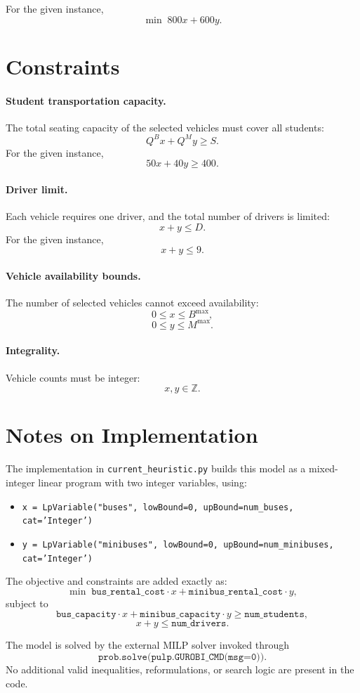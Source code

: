 For the given instance,
\[
\min \; 800x + 600y.
\]

\section*{Constraints}

\paragraph{Student transportation capacity.}
The total seating capacity of the selected vehicles must cover all students:
\[
Q^B x + Q^M y \ge S.
\]
For the given instance,
\[
50x + 40y \ge 400.
\]

\paragraph{Driver limit.}
Each vehicle requires one driver, and the total number of drivers is limited:
\[
x + y \le D.
\]
For the given instance,
\[
x + y \le 9.
\]

\paragraph{Vehicle availability bounds.}
The number of selected vehicles cannot exceed availability:
\[
0 \le x \le B^{\max},
\]
\[
0 \le y \le M^{\max}.
\]

\paragraph{Integrality.}
Vehicle counts must be integer:
\[
x, y \in \mathbb{Z}.
\]

\section*{Notes on Implementation}

The implementation in \texttt{current\_heuristic.py} builds this model as a mixed-integer linear program with two integer variables, using:
\begin{itemize}
\item \texttt{x = LpVariable("buses", lowBound=0, upBound=num\_buses, cat='Integer')}
\item \texttt{y = LpVariable("minibuses", lowBound=0, upBound=num\_minibuses, cat='Integer')}
\end{itemize}

The objective and constraints are added exactly as:
\[
\min \; \texttt{bus\_rental\_cost}\cdot x + \texttt{minibus\_rental\_cost}\cdot y,
\]
subject to
\[
\texttt{bus\_capacity}\cdot x + \texttt{minibus\_capacity}\cdot y \ge \texttt{num\_students},
\]
\[
x+y \le \texttt{num\_drivers}.
\]

The model is solved by the external MILP solver invoked through
\[
\texttt{prob.solve(pulp.GUROBI\_CMD(msg=0))}.
\]
No additional valid inequalities, reformulations, or search logic are present in the code.
